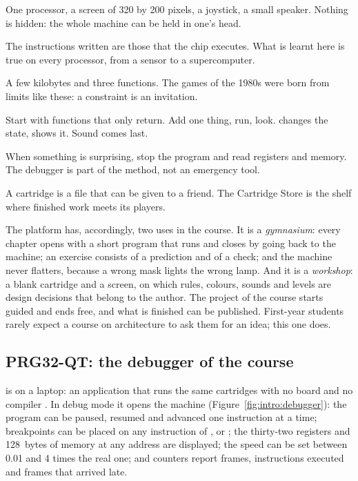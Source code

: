 \begin{description}[style=nextline,leftmargin=1.5em]
\item[Small enough to understand.] One processor, a screen of 320 by 200
  pixels, a joystick, a small speaker. Nothing is hidden: the whole machine can be
  held in one's head.
\item[Real, not simulated.] The instructions written are those that the chip
  executes. What is learnt here is true on every \riscv processor, from a
  sensor to a supercomputer.
\item[Limits make you creative.] A few kilobytes and three functions. The
  games of the 1980s were born from limits like these: a constraint is an
  invitation.
\item[One thing at a time.] Start with functions that only return. Add one
  thing, run, look.  changes the state,  shows it.
  Sound comes last.
\item[Look inside.] When something is surprising, stop the program and read
  registers and memory. The debugger is part of the method, not an emergency
  tool.
\item[Make, then share.] A cartridge is a file that can be given to a friend.
  The Cartridge Store is the shelf where finished work meets its players.
\end{description}

The platform has, accordingly, two uses in the course. It is a
\emph{gymnasium}: every chapter opens with a short program that runs and
closes by going back to the machine; an exercise consists of a prediction and
of a check; and the machine never flatters, because a wrong mask lights the
wrong lamp. And it is a \emph{workshop}: a blank cartridge and a screen, on
which rules, colours, sounds and levels are design decisions that belong to
the author. The project of the course starts guided and ends free, and what
is finished can be published. First-year students rarely expect a course on
architecture to ask them for an idea; this one does.

\subsection{PRG32-QT: the debugger of the course}

\prgqt is \prg on a laptop: an application that runs the same cartridges with
no board and no compiler \citep{prg32qt}. In debug mode it opens the machine
(Figure~\ref{fig:intro:debugger}): the program can be paused, resumed and
advanced one instruction at a time; breakpoints can be placed on any
instruction of ,  or ; the thirty-two
registers and 128~bytes of memory at any address are displayed; the speed can
be set between 0.01 and 4 times the real one; and counters report frames,
instructions executed and frames that arrived late.

